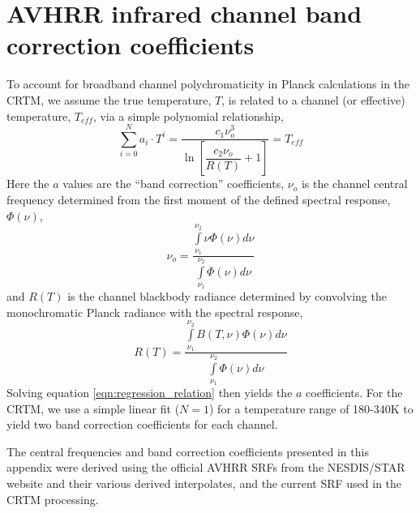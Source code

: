\section{AVHRR infrared channel band correction coefficients}
\label{app:band_correction_coefficients}
To account for broadband channel polychromaticity in Planck calculations in the CRTM, we assume the true temperature, $T$, is related to a channel (or effective) temperature, $T_{eff}$, via a simple polynomial relationship,
\begin{equation}
  \sum_{i=0}^{N} a_i\cdot T^{i} = \dfrac{c_1\nu_o^3}{\ln\left[ \dfrac{c_2\nu_o}{R(T)}+1 \right]} = T_{eff}
  \label{eqn:regression_relation}
\end{equation}
Here the $a$ values are the ``band correction'' coefficients, $\nu_o$ is the channel central frequency determined from the first moment of the defined spectral response, $\Phi(\nu)$,
\begin{equation}
  \nu_o = \dfrac{\int\limits_{\nu_1}^{\nu_2}\nu\Phi(\nu)d\nu}{\int\limits_{\nu_1}^{\nu_2}\Phi(\nu)d\nu}
\end{equation}
and $R(T)$ is the channel blackbody radiance determined by convolving the monochromatic Planck radiance with the spectral response,
\begin{equation}
  R(T) = \dfrac{\int\limits_{\nu_1}^{\nu_2}B(T,\nu)\Phi(\nu)d\nu}{\int\limits_{\nu_1}^{\nu_2}\Phi(\nu)d\nu}
\end{equation}
Solving equation \ref{eqn:regression_relation} then yields the $a$ coefficients. For the CRTM, we use a simple linear fit ($N=1$) for a temperature range of 180-340K to yield two band correction coefficients for each channel.

The central frequencies and band correction coefficients presented in this appendix were derived using the official AVHRR SRFs from the NESDIS/STAR website \citep{NESDIS_AVHRR_SRFs} and their various derived interpolates, and the current SRF used in the CRTM processing.

